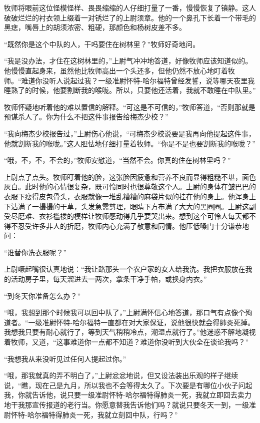     牧师将眼前这位怪模怪样、畏畏缩缩的人仔细打量了一番，慢慢恢复了镇静。这人破破烂烂的衬衣领上缀着一对锈烂了的上尉须章。他的一个鼻孔下长着一个带毛的黑痣，嘴唇上的胡须浓密、粗硬，那颜色和杨树皮差不多。

    “既然你是这个中队的人，干吗要住在树林里？”牧师好奇地问。

    “我是没办法，才住在这树林里的，”上尉气冲冲地答道，好像牧师应该知道似的。他慢慢直起身来，虽然他比牧师高出一个头还多，但他仍然不放心地盯着牧师。“难道你没听人说起过我？一级准尉怀特-哈尔福特曾经发誓，说等哪天夜里我睡熟了的时候，他要割断我的喉咙。所以，只要他还活着，我就不敢睡在中队里。”

    牧师怀疑地听着他的难以置信的解释。“可这是不可信的，”牧师答道，“否则那就是预谋杀人了。你为什么不把这件事报告给梅杰少校？”

    “我向梅杰少校报告过，”上尉伤心他说，“可梅杰少校说要是我再向他提起这件事，他就割断我的喉咙。”这人胆怯地仔细打量着牧师。“你是不是也要割断我的喉咙？”

    “哦，不，不，不会的，”牧师安慰道，“当然不会。你真的住在树林里吗？”

    上尉点了点头。牧师盯着他的脸，这张脸因疲惫和营养不良而显得粗糙不堪，面色灰白。此时他的心情很复杂，既可怜同时也很尊敬这个人。上尉的身体在皱巴巴的衣服下瘦得皮包骨头，衣服就像一堆乱糟糟的麻袋片似的挂在他的身上。他浑身上下沾满了一撮撮的干草，头发急需剪理，眼睛下方布满了大大的黑圈圈。上尉这副受尽磨难、衣衫褴褛的模样让牧师感动得几乎要哭出来。想到这个可怜人每天都不得不忍受许多非人的折磨，牧师内心充满了敬意和同情。他压低嗓门十分谦恭地问：

    “谁替你洗衣服呢？”

    上尉噘起嘴很认真地说：“我让路那头一个农户家的女人给我洗。我把衣服放在我的活动房子里，每天溜进去一两次，拿条干净手帕，或换身内衣。”

    “到冬天你准备怎么办？”

    “哦，我想到那个时候我可以回中队了，”上尉满怀信心地答道，那口气有点像个殉道者。“一级准尉怀特-哈尔福特一直都在对大家保证，说他很快就会得肺炎死掉。我想我只要有耐心就行了，等到天气稍稍冷点，潮湿点就行了。”他迷惑不解地凝视着牧师，又道，“这事难道你一点都不知道？难道你没听到大伙全在谈论我吗？”

    “我想我从来没听见过任何人提起过你。”

    “哦，那我就真的弄不明白了，”上尉忿忿地说，但又设法装出乐观的样子继续说，“瞧，现在己是九月，所以我也不会等得太久了。下次要是有哪位小伙子问起我，你就告诉他，说只要一级准尉怀特-哈尔福特得肺炎一死，我就立即回去卖力地干我那宣传报道的老行当。你愿意替我告诉他们吗？就说只要冬天一到，一级准尉怀特-哈尔福特得肺炎一死，我就立刻回中队，行吗？”

